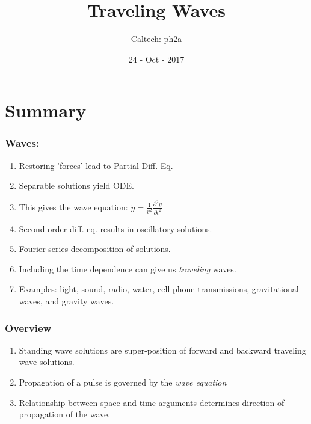 \documentclass[pdf, handout, hideothersubsections]{beamer}
\begin{document}
\title{Traveling Waves}  
\author{Caltech: ph2a}
\date{24 - Oct - 2017}


\frame{\titlepage} 



\section{Summary}
\begin{frame}
\frametitle{Waves:}
\begin{enumerate}
  \pause
\item Restoring 'forces' lead to Partial Diff. Eq.
  \pause
\item Separable solutions yield ODE.
  \pause
\item This gives the wave equation: 
  $\ddot{y} = \frac{1}{v^2} \frac{\partial^2 y}{\partial t^2}$
  \pause
\item Second order diff. eq. results in oscillatory solutions.
\pause
\item Fourier series decomposition of solutions.
\pause
\item Including the time dependence can give us \emph{traveling}
  waves.
\pause
\item Examples: light, sound, radio, water, cell phone transmissions,
  gravitational waves, and gravity waves.

\end{enumerate}
\end{frame}


\begin{frame}
\frametitle{Overview}
\begin{enumerate}
\pause
\item Standing wave solutions are super-position of forward and
  backward traveling wave solutions.
\pause
\item Propagation of a pulse is governed by the \emph{wave equation}
\pause
\item Relationship between space and time arguments determines
  direction of propagation of the wave.

\end{enumerate}
\end{frame}
\end{document}
